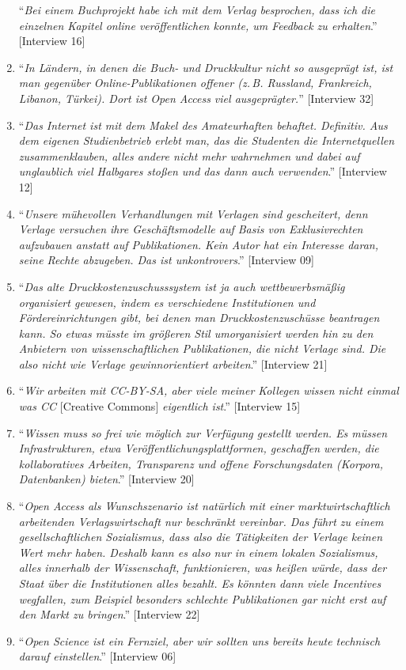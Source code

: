 \documentclass[a4paper,
fontsize=11pt,
oneside,
numbers=noperiodatend,
parskip=half-,
bibliography=totoc,
final
]{scrartcl}
\begin{document}
\begin{enumerate}
  \enquote{\emph{Bei einem Buchprojekt habe ich mit dem Verlag
  besprochen, dass ich die einzelnen Kapitel online veröffentlichen
  konnte, um Feedback zu erhalten}.} {[}Interview 16{]}
\item
  \enquote{\emph{In Ländern, in denen die Buch- und Druckkultur nicht so
  ausgeprägt ist, ist man gegenüber Online-Publikationen offener (z.\,B.
  Russland, Frankreich, Libanon, Türkei). Dort ist Open Access viel
  ausgeprägter.}} {[}Interview 32{]}
\item
  \enquote{\emph{Das Internet ist mit dem Makel des Amateurhaften
  behaftet. Definitiv. Aus dem eigenen Studienbetrieb erlebt man, das
  die Studenten die Internetquellen zusammenklauben, alles andere nicht
  mehr wahrnehmen und dabei auf unglaublich viel Halbgares stoßen und
  das dann auch verwenden}.} {[}Interview 12{]}
\item
  \enquote{\emph{Unsere mühevollen Verhandlungen mit Verlagen sind
  gescheitert, denn Verlage versuchen ihre Geschäftsmodelle auf Basis
  von Exklusivrechten aufzubauen anstatt auf Publikationen. Kein Autor
  hat ein Interesse daran, seine Rechte abzugeben. Das ist
  unkontrovers}.} {[}Interview 09{]}
\item
  \enquote{\emph{Das alte Druckkostenzuschusssystem ist ja auch wettbewerbsmäßig
  organisiert gewesen, indem es verschiedene Institutionen und
  Fördereinrichtungen gibt, bei denen man Druckkostenzuschüsse
  beantragen kann. So etwas müsste im größeren Stil umorganisiert werden
  hin zu den Anbietern von wissenschaftlichen Publikationen, die nicht
  Verlage sind. Die also nicht wie Verlage gewinnorientiert arbeiten}.}
  {[}Interview 21{]}
\item
  \enquote{\emph{Wir arbeiten mit CC-BY-SA, aber viele meiner Kollegen
  wissen nicht einmal was CC} {[}Creative Commons{]} \emph{eigentlich
  ist}.} {[}Interview 15{]}
\item
  \enquote{\emph{Wissen muss so frei wie möglich zur Verfügung gestellt
  werden. Es müssen Infrastrukturen, etwa Veröffentlichungsplattformen,
  geschaffen werden, die kollaboratives Arbeiten, Transparenz und offene
  Forschungsdaten (Korpora, Datenbanken) bieten}.} {[}Interview 20{]}
\item
  \enquote{\emph{Open Access als Wunschszenario ist natürlich mit einer
  marktwirtschaftlich arbeitenden Verlagswirtschaft nur beschränkt
  vereinbar. Das führt zu einem gesellschaftlichen Sozialismus, dass
  also die Tätigkeiten der Verlage keinen Wert mehr haben. Deshalb kann
  es also nur in einem lokalen Sozialismus, alles innerhalb der
  Wissenschaft, funktionieren, was heißen würde, dass der Staat über die
  Institutionen alles bezahlt. Es könnten dann viele Incentives
  wegfallen, zum Beispiel besonders schlechte Publikationen gar nicht
  erst auf den Markt zu bringen}.} {[}Interview 22{]}
\item
  \enquote{\emph{Open Science ist ein Fernziel, aber wir sollten uns
  bereits heute technisch darauf einstellen}.} {[}Interview 06{]}
\end{enumerate}
\end{document}
